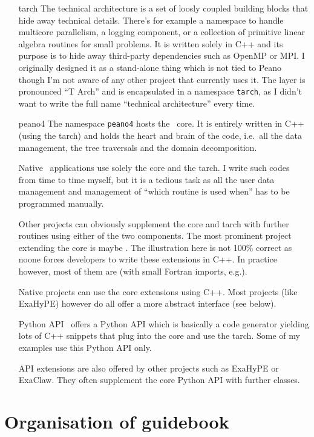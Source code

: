 \begin{itemize}
  \item[tarch] The technical architecture is a set of loosly coupled building
  blocks that hide away technical details. There's for example a namespace to
  handle multicore parallelism, a logging component, or a collection of
  primitive linear algebra routines for small problems. It is written solely in
  C++ and its purpose is to hide away third-party dependencies such as OpenMP
  or MPI. I originally designed it as a stand-alone thing which is not tied to
  Peano though I'm not aware of any other project that currently uses it. The
  layer is pronounced ``T Arch'' and is encapsulated in a namespace
  \texttt{tarch}, as I didn't want to write the full name ``technical
  architecture'' every time.
  \item[peano4] The namespace \texttt{peano4} hosts the \Peano\ core. It is
  entirely written in C++ (using the tarch) and holds the heart and brain of the
  code, i.e.~all the data management, the tree traversals and the domain
  decomposition.
  \item[Native] \Peano\ applications use solely the core and the tarch. I write
  such codes from time to time myself, but it is a tedious task as all the user
  data management and management of ``which routine is used when'' has to be
  programmed manually.
  \item[Other projects] can obviously supplement the core and tarch with further
  routines using either of the two components. The most prominent project
  extending the core is maybe \ExaHyPE. The illustration here is not 100\%
  correct as noone forces developers to write these extensions in C++. In
  practice however, most of them are (with small Fortran imports, e.g.). 
  \item[Native projects] can use the core extensions using C++. Most projects
  (like ExaHyPE) however do all offer a more abstract interface (see below).
  \item[Python API] \Peano\ offers a Python API which is basically a code
  generator yielding lots of C++ snippets that plug into the core and use the
  tarch. Some of my examples use this Python API only.
  \item[API extensions] are also offered by other projects such as ExaHyPE or
  ExaClaw. They often supplement the core Python API with further classes.
\end{itemize}


\section*{Organisation of guidebook}

